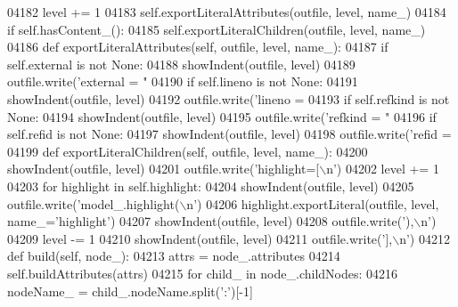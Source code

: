 \begin{DoxyCode}
{{{{{{{{{{{{{{{{{{{{{{{{{{{{{{{{{{{{{{{{{{{{{{{{{{{{{{{{{{{{{{{{{{{{{{{{{{{{{{{{{{{{{{{{{{{{{{{{{{{{{{{{{{{{{{{{{{{{{{{{{{{{{{{{{{{{{{{{{{{{{{{{{{{{{{{{{{{{{{{{{{{{{{{{{{{{{{{{{{{{{{{{{{{{{{{{{{{{{{{{{{{{{{{{{{{{{{{{{{{{{{{{{{{{{{{{{{{{{{{{{{{{{{{{{{{{{{{{{{{{{{{{{{{{{{{{{04182         level += 1
04183         self.exportLiteralAttributes(outfile, level, name\_)
04184         \textcolor{keywordflow}{if} self.hasContent_():
04185             self.exportLiteralChildren(outfile, level, name\_)
04186     \textcolor{keyword}{def }exportLiteralAttributes(self, outfile, level, name\_):
04187         \textcolor{keywordflow}{if} self.external \textcolor{keywordflow}{is} \textcolor{keywordflow}{not} \textcolor{keywordtype}{None}:
04188             showIndent(outfile, level)
04189             outfile.write(\textcolor{stringliteral}{'external = "%
04190         \textcolor{keywordflow}{if} self.lineno \textcolor{keywordflow}{is} \textcolor{keywordflow}{not} \textcolor{keywordtype}{None}:
04191             showIndent(outfile, level)
04192             outfile.write(\textcolor{stringliteral}{'lineno = %
04193         \textcolor{keywordflow}{if} self.refkind \textcolor{keywordflow}{is} \textcolor{keywordflow}{not} \textcolor{keywordtype}{None}:
04194             showIndent(outfile, level)
04195             outfile.write(\textcolor{stringliteral}{'refkind = "%
04196         \textcolor{keywordflow}{if} self.refid \textcolor{keywordflow}{is} \textcolor{keywordflow}{not} \textcolor{keywordtype}{None}:
04197             showIndent(outfile, level)
04198             outfile.write(\textcolor{stringliteral}{'refid = %
04199     \textcolor{keyword}{def }exportLiteralChildren(self, outfile, level, name\_):
04200         showIndent(outfile, level)
04201         outfile.write(\textcolor{stringliteral}{'highlight=[\(\backslash\)n'})
04202         level += 1
04203         \textcolor{keywordflow}{for} highlight \textcolor{keywordflow}{in} self.highlight:
04204             showIndent(outfile, level)
04205             outfile.write(\textcolor{stringliteral}{'model\_.highlight(\(\backslash\)n'})
04206             highlight.exportLiteral(outfile, level, name\_=\textcolor{stringliteral}{'highlight'})
04207             showIndent(outfile, level)
04208             outfile.write(\textcolor{stringliteral}{'),\(\backslash\)n'})
04209         level -= 1
04210         showIndent(outfile, level)
04211         outfile.write(\textcolor{stringliteral}{'],\(\backslash\)n'})
04212     \textcolor{keyword}{def }build(self, node\_):
04213         attrs = node\_.attributes
04214         self.buildAttributes(attrs)
04215         \textcolor{keywordflow}{for} child\_ \textcolor{keywordflow}{in} node\_.childNodes:
04216             nodeName\_ = child\_.nodeName.split(\textcolor{stringliteral}{':'})[-1]
}}}}}}}}}}}}}}}}}}}}}}}}}}}}}}}}}}}}}}}}}}}}}}}}}}}}}}}}}}}}}}}}}}}}}}}}}}}}}}}}}}}}}}}}}}}}}}}}}}}}}}}}}}}}}}}}}}}}}}}}}}}}}}}}}}}}}}}}}}}}}}}}}}}}}}}}}}}}}}}}}}}}}}}}}}}}}}}}}}}}}}}}}}}}}}}}}}}}}}}}}}}}}}}}}}}}}}}}}}}}}}}}}}}}}}}}}}}}}}}}}}}}}}}}}}}}}}}}}}}}}}}}}}}}}}}}}}}}}
\end{DoxyCode}
